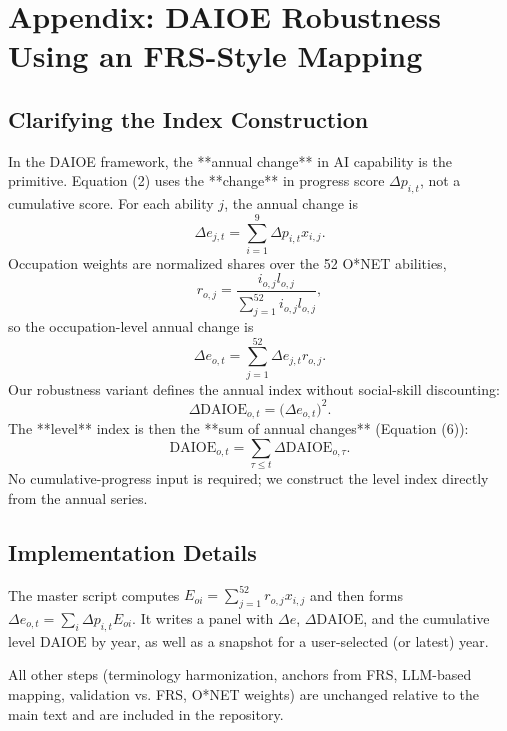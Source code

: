 \section*{Appendix: DAIOE Robustness Using an FRS-Style Mapping}

\subsection*{Clarifying the Index Construction}
In the DAIOE framework, the **annual change** in AI capability is the primitive. Equation (2) uses the **change** in progress score $\Delta p_{i,t}$, not a cumulative score. For each ability $j$, the annual change is
\begin{equation}
\Delta e_{j,t} = \sum_{i=1}^9 \Delta p_{i,t} x_{i,j}.
\end{equation}
Occupation weights are normalized shares over the 52 O*NET abilities,
\begin{equation}
r_{o,j} = \frac{i_{o,j} l_{o,j}}{\sum_{j=1}^{52} i_{o,j} l_{o,j}},
\end{equation}
so the occupation-level annual change is
\begin{equation}
\Delta e_{o,t} = \sum_{j=1}^{52} \Delta e_{j,t} r_{o,j}.
\end{equation}
Our robustness variant defines the annual index without social-skill discounting:
\begin{equation}
\Delta \mathrm{DAIOE}_{o,t} = \big(\Delta e_{o,t}\big)^2.
\end{equation}
The **level** index is then the **sum of annual changes** (Equation (6)):
\begin{equation}
\mathrm{DAIOE}_{o,t} = \sum_{\tau \le t} \Delta \mathrm{DAIOE}_{o,\tau}.
\end{equation}
No cumulative-progress input is required; we construct the level index directly from the annual series.

\subsection*{Implementation Details}
The master script computes $E_{oi}=\sum_{j=1}^{52}r_{o,j}x_{i,j}$ and then forms $\Delta e_{o,t}=\sum_i \Delta p_{i,t}E_{oi}$. It writes a panel with $\Delta e$, $\Delta \mathrm{DAIOE}$, and the cumulative level $\mathrm{DAIOE}$ by year, as well as a snapshot for a user-selected (or latest) year.

All other steps (terminology harmonization, anchors from FRS, LLM-based mapping, validation vs. FRS, O*NET weights) are unchanged relative to the main text and are included in the repository.
